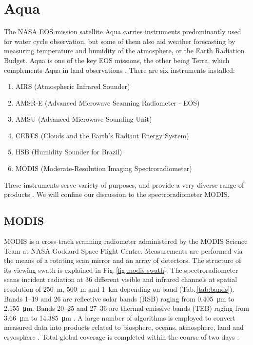 \section{Aqua}
The NASA EOS mission satellite Aqua carries instruments predominantly used for
water cycle observation, but some of them also aid weather forecasting by
measuring temperature and humidity of the atmosphere, or the Earth Radiation
Budget. Aqua is one of the key EOS missions, the other being Terra, which 
complements Aqua in land observations
\citep{Parkinson2003}. There are six
instruments installed:

\begin{enumerate}
\item AIRS (Atmospheric Infrared Sounder)
\item AMSR-E (Advanced Microwave Scanning Radiometer - EOS)
\item AMSU (Advanced Microwave Sounding Unit)
\item CERES (Clouds and the Earth’s Radiant Energy System)
\item HSB (Humidity Sounder for Brazil)
\item MODIS (Moderate-Resolution Imaging Spectroradiometer)
\end{enumerate}

These instruments serve variety of purposes, and provide a very diverse range of
products \citep{ScienceWritersGuideToAqua2002}. We will confine our discussion
to the spectroradiometer MODIS.


\subsection{MODIS}
MODIS is a cross-track scanning radiometer administered by the MODIS Science
Team at NASA Goddard Space Flight Centre. Measurements are performed via the
means of a rotating scan mirror and an array
of detectors. The structure of its viewing swath is explained in
Fig.\,\ref{fig:modis-swath}. The spectroradiometer scans incident
radiation at 36 different visible and infrared channels at spatial resolution of
\SI{250}{m}, \SI{500}{m} and \SI{1}{km} depending on band
(Tab.\,\ref{tab:bands}). Bands 1--19 and 26
are reflective solar
bands (RSB) raging from \SI{0.405}{μm} to \SI{2.155}{μm}. Bands 20--25
and 27--36 are
thermal emissive bands (TEB) raging from \SI{3.66}{μm} to \SI{14.385}{μm} \cite{MODIS_Specifications}. A
large
number
of algorithms is employed to convert measured data into products related to
biosphere, oceans, atmosphere, land and cryosphere \citep{AquaBrochure2002}.
Total global coverage is completed within the course of two
days \citep{Xiong2006}.


